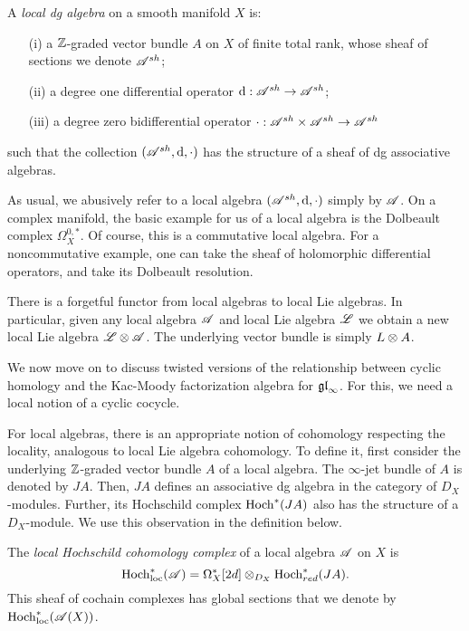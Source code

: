 \begin{dfn}\label{def: localalg}
A {\em local dg algebra} on a smooth manifold $X$ is:
\begin{enumerate}
\item[(i)] a $\mathbb Z$-graded vector bundle $A$ on $X$ of finite total rank, whose sheaf of sections we denote $\mathscr A^{sh}$;
\item[(ii)] a degree one differential operator ${\rm d} : \mathscr A^{sh} \to \mathscr A^{sh}$;
\item[(iii)] a degree zero bidifferential operator $\cdot : \mathscr A^{sh} \times \mathscr A^{sh} \to \mathscr A^{sh}$
\end{enumerate}
such that the collection $(\mathscr A^{sh}, {\rm d}, \cdot)$ has the structure of a sheaf of dg associative algebras.
\end{dfn}

As usual, we abusively refer to a local algebra $(\mathscr A^{sh}, {\rm d}, \cdot)$ simply by $\mathscr A$.
On a complex manifold, the basic example for us of a local algebra is the Dolbeault complex $\Omega^{0,*}_X$. 
Of course, this is a commutative local algebra. 
For a noncommutative example, one can take the sheaf of holomorphic differential operators, and take its Dolbeault resolution. 

There is a forgetful functor from local algebras to local Lie algebras. 
In particular, given any local algebra $\mathscr A$ and local Lie algebra $\mathscr L$ we obtain a new local Lie algebra $\mathscr L \otimes \mathscr A$.
The underlying vector bundle is simply $L \otimes A$. 

We now move on to discuss twisted versions of the relationship between cyclic homology and the Kac-Moody factorization algebra for ${\mathfrak{gl}}_\infty$. 
For this, we need a local notion of a cyclic cocycle. 

For local algebras, there is an appropriate notion of cohomology respecting the locality, analogous to local Lie algebra cohomology. 
To define it, first consider the underlying $\mathbb Z$-graded vector bundle $A$ of a local algebra. 
The $\infty$-jet bundle of $A$ is denoted by $JA$.
Then, $JA$ defines an associative dg algebra in the category of $D_X$-modules. 
Further, its Hochschild complex $\Hoch^*(JA)$ also has the structure of a $D_X$-module. 
We use this observation in the definition below. 

\def\Hoch{{\rm Hoch}}
\def\Hochloc{{\rm Hoch}_{\rm loc}}
\def\Cyc{{\rm Cyc}}
\def\Cycloc{{\rm Cyc}_{\rm loc}}

\begin{dfn}\label{dfn: hochloc}
The {\em local Hochschild cohomology complex}  of a local algebra $\mathscr A$ on $X$ is 
\[
\Hochloc^*(\sA) = \Omega^*_X[2d] \tensor_{D_X} \Hoch^*_{red} (JA) .
\] 
This sheaf of cochain complexes has global sections that we denote by $\Hochloc^*(\sA(X))$.
\end{dfn}

